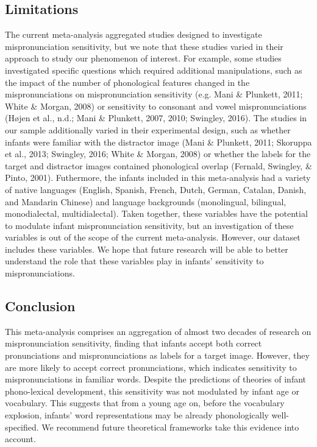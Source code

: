 \documentclass[man]{apa6}
\theoremstyle{definition}
\theoremstyle{definition}
\theoremstyle{definition}
\theoremstyle{remark}
\begin{document}
\subsection{Limitations}\label{limitations}

The current meta-analysis aggregated studies designed to investigate
mispronunciation sensitivity, but we note that these studies varied in
their approach to study our phenomenon of interest. For example, some
studies investigated specific questions which required additional
manipulations, such as the impact of the number of phonological features
changed in the mispronunciations on mispronunciation sensitivity (e.g.
Mani \& Plunkett, 2011; White \& Morgan, 2008) or sensitivity to
consonant and vowel mispronunciations (Højen et al., n.d.; Mani \&
Plunkett, 2007, 2010; Swingley, 2016). The studies in our sample
additionally varied in their experimental design, such as whether
infants were familiar with the distractor image (Mani \& Plunkett, 2011;
Skoruppa et al., 2013; Swingley, 2016; White \& Morgan, 2008) or whether
the labels for the target and distractor images contained phonological
overlap (Fernald, Swingley, \& Pinto, 2001). Futhermore, the infants
included in this meta-analysis had a variety of native languages
(English, Spanish, French, Dutch, German, Catalan, Danish, and Mandarin
Chinese) and language backgrounds (monolingual, bilingual,
monodialectal, multidialectal). Taken together, these variables have the
potential to modulate infant mispronunciation sensitivity, but an
investigation of these variables is out of the scope of the current
meta-analysis. However, our dataset includes these variables. We hope
that future research will be able to better understand the role that
these variables play in infants' sensitivity to mispronunciations.

\subsection{Conclusion}\label{conclusion}

This meta-analysis comprises an aggregation of almost two decades of
research on mispronunciation sensitivity, finding that infants accept
both correct pronunciations and mispronunciations as labels for a target
image. However, they are more likely to accept correct pronunciations,
which indicates sensitivity to mispronunciations in familiar words.
Despite the predictions of theories of infant phono-lexical development,
this sensitivity was not modulated by infant age or vocabulary. This
suggests that from a young age on, before the vocabulary explosion,
infants' word representations may be already phonologically
well-specified. We recommend future theoretical frameworks take this
evidence into account.
\end{document}
